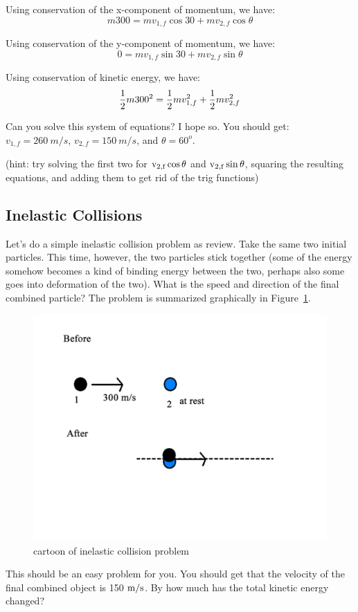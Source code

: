 Using conservation of the x-component of momentum, we have:
$$ m 300 = m v_{1,f} \cos{30} + m v_{2,f} \cos{\theta} $$

Using conservation of the y-component of momentum, we have:
$$ 0 = m v_{1,f} \sin{30} + m v_{2,f} \sin{\theta} $$

Using conservation of kinetic energy, we have:
$$ {1 \over 2} m 300^2 = {1 \over 2} m v_{1,f}^2 + {1 \over 2} m v_{2,f}^2 $$

Can you solve this system of equations?  I hope so.  You should get:
$v_{1,f}=260~m/s$, $v_{2,f}=150~m/s$, and $\theta = 60^o$.

(hint: try solving the first two for 
${\rm v_{2,f} \cos{\theta}}$ and ${\rm v_{2,f} \sin{\theta}}$, 
squaring the resulting equations, and adding them to get rid of the trig functions)

\subsection{Inelastic Collisions}

Let's do a simple inelastic collision problem as review.  Take the same two initial particles.  This time, however, the two particles stick together (some of the energy somehow becomes a kind of binding energy between the two, perhaps also some goes into deformation of the two).  What is the speed and direction of the final combined particle?  The problem is summarized graphically in Figure~\ref{fig:inelastic}.
 
\begin{figure}[h]
\centering\includegraphics[scale=0.5]{./collisions/Pictures/inelastic.pdf}
\caption{cartoon of inelastic collision problem}
\label{fig:inelastic}
\end{figure}


This should be an easy problem for you. You should get that the velocity of the final combined object is 150 ${\rm m/s}$.
By how much has the total kinetic energy changed?
